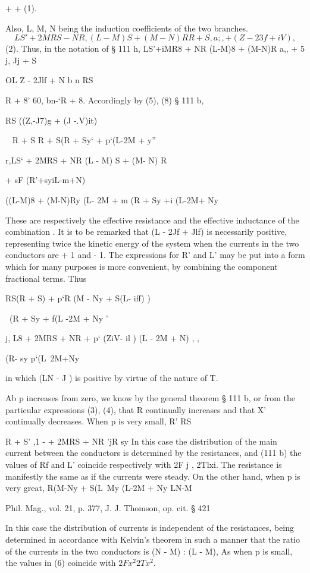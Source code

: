 + + (1).

Also, L, M, N being the induction coefficients of the two branches.
\[ LS' + 2MRS- NR , (L-M)S+(M-N)R R + S ,a;, + (Z-23f+iV),\]
(2).  Thus, in the notation of § 111 h,
LS'+iMR8 + NR (L-M)8 + (M-N)R a,,  + 5 j,  Jj + S

OL  Z - 2Jlf + N b n RS

R + 8' 60, bn-‘R + 8.  Accordingly by (5), (8) § 111 b,

RS  ((Z,-J7)g + (J -.V)it)

~ R + S R + S(R + Sy‘ + p‘(L-2M + y''

r,LS‘ + 2MRS + NR  (L - M) S + (M- N) R

 + sF  (R'+syiL-m+N)

((L-M)8 + (M-N)Ry (L- 2M + m (R + Sy +i (L-2M+ Ny

These are respectively the effective resistance and the effective inductance of
the combination . It is to be remarked that (L - 2Jf + Jlf) is necessarily
positive, representing twice the kinetic energy of the system when the currents
in the two conductors are + 1 and - 1.  The expressions for R' and L' may be
put into a form which for many purposes is more convenient, by combining the
component fractional terms. Thus

 RS(R + S) + p‘R (M - Ny + S(L- iff) )

 ~(R + Sy + f(L -2M + Ny '

j,  L8 + 2MRS + NR + p‘ (ZiV- il ) (L - 2M + N) , ,

   (R- sy p‘(L~2M+Ny

in which (LN - J ) is positive by virtue of the nature of T.

Ab p increases from zero, we know by the general theorem § 111 b, or from the
particular expressions (3), (4), that R continually increases and that X'
continually decreases.  When p is very small, R' RS

R + S' ,1 - + 2MRS + NR 'jR sy In this case the distribution of the main
current between the conductors is determined by the resistances, and (111 b)
the values of Rf and L' coincide respectively with 2F j , 2Tlxi. The resistance
is manifestly the same as if the currents were steady.  On the other hand, when
p is very great, R(M-Ny + S(L~My (L-2M + Ny LN-M

 Phil. Mag., vol. 21, p. 377, J. J. Thomson, op. cit. § 421

In this case the distribution of currents is independent of the resistances,
being determined in accordance with Kelvin’s theorem in such a manner that the
ratio of the currents in the two conductors is (N - M) : (L - M), As when p is
small, the values in (6) coincide with \( 2 F x^2 2 T x^2 \).


